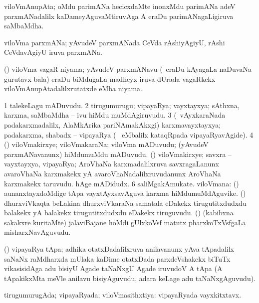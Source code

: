 \bentry
{}
\gl{\nA}
\bmng
viloVmAnupAta; oMdu parimANa hecicxdaMte inonxMdu parimANa adeV parxmANadalilx kaDameyAguvaMtiruvAga A eraDu parimANagaLigiruva saMbaMdha. 
\emng
\eentry

\bentry
{}
\gl{\nA}
\bmng
viloVma parxmANa; yAvudeV parxmANada CeVda rAshiyAgiyU, rAshi CeVdavAgiyU iruva parxmANa. 
\emng
\eentry

\bentry
{}
\gl{\nA}
\bmng
(\Bwvi) viloVma vagaR niyama; yAvudeV parxmANavu (\udA\ eraDu kAyagaLa naDuvaNa gurutavx bala) eraDu biMdugaLa madheyx iruva dUrada vagaRkekx viloVmAnupAtadalilxrutatxde eMba niyama. 
\emng
\eentry

\bentry
{}
\gl{\nA}
\bmng
\bnum
\num{1} talekeLagu mADuvudu. 
\num{2} tirugumurugu; vipayaRya; vayxtayxya; sAthxna, karxma, saMbaMdha -- ivu hiMdu muMdAgiruvudu. 
\num{3} (\kanmu\ vAyxkaraNada padakarxmadalilx, AlaMkArika pariNAmakAkxgi) karxmavayxtayxya; padakarxma, shabadx -- vipayaRya (\udA\  eMbalilx kataqRpada vipayaRyavAgide). 
\num{4} (\ga) viloVmakirxye; viloVmakaraNa; viloVma mADuvudu; (yAvudeV parxmANavanunx) hiMdumuMdu mADuvudu. 
 (\saM) 
\banum
{} viloVmakirxye; savxra -- vayxtayxya, vipayaRya; AroVhaNa karxmadalilxruva savxragaLanunx avaroVhaNa karxmakekx yA avaroVhaNadalilxruvudanunx AroVhaNa karxmakekx taruvudu. 
 hAge mADidudx. 
\eanum
\numie
\num{6} saliMgakAmukate. 
 viloVmana: 
\banum
{} (\pashA) aunanxtayxdoMdige tApa vayxtAyxsavAguva karxma hiMdumuMdAguvike. 
 (\ravi) dhurxviVkaqta beLakina dhurxviVkaraNa samatala eDakekx tirugutitxdudxdu balakekx yA balakekx tirugutitxdudxdu eDakekx tiruguvudu. 
 (\ravi) (kabibxna sakakxre kuritaMte) jalaviBajane hoMdi gUlxkoVsf matutx pharxkoTxVsfgaLa misharxNavAguvudu. 
\eanum
\numie
\enum
\emng
\eentry

\bentry
{}
\gl{\nA}
\bmng
(\Bwvi) vipayaRya tApa; adhika otatxDadalilxruva anilavanunx yAva tApadalilx saNaNx raMdharxda mUlaka kaDime otatxDada parxdeVshakekx biTuTx vikasisidAga adu bisiyU Agade taNaNxgU Agade iruvudoV A tApa (A tApakikxMta meVle anilavu bisiyAguvudu, adara keLage adu taNaNxgAguvudu). 
\emng
\eentry

\bentry
{}
\gl{\gu}
\bmng
tirugumurugAda; vipayaRyada; viloVmasithxtiya:  vipayaRyada vayxkitxtavx. 
\emng
\eentry

